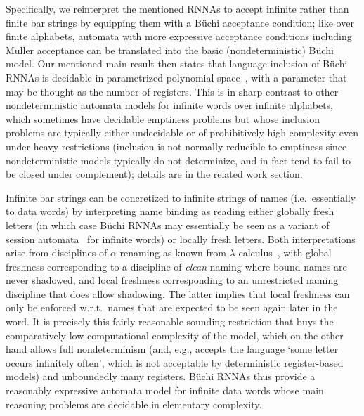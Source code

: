 \documentclass[final,a4paper,UKenglish,thm-restate,autoref,numberwithinsect]{lipics-v2021}
\numberwithin{equation}{section}
\newcommand{\+}[1]{\mathcal{#1}\xspace}
\theoremstyle{definition}
\begin{document}
\enlargethispage{5pt} Specifically, we reinterpret the mentioned RNNAs
to accept infinite rather than finite bar strings by equipping them
with a B\"uchi acceptance condition; like over finite alphabets,
automata with more expressive acceptance conditions including Muller
acceptance can be translated into the basic (nondeterministic) B\"uchi
model. Our mentioned main result then states that language inclusion
of B\"uchi RNNAs is decidable in parametrized polynomial
space~\cite{StockhusenTantau13}, with a parameter that may be thought
as the number of registers. This is in sharp contrast to other
nondeterministic automata models for infinite words over infinite
alphabets, which sometimes have decidable emptiness problems but whose
inclusion problems are typically either undecidable or of
prohibitively high complexity even under heavy restrictions (inclusion
is not normally reducible to emptiness since nondeterministic models
typically do not determinize, and in fact tend to fail to be closed
under complement); details are in the related work section.

Infinite bar strings can be concretized to infinite strings of names
(i.e.~essentially to data words) by interpreting name binding as
reading either globally fresh letters (in which case B\"uchi RNNAs may
essentially be seen as a variant of session automata~\cite{BolligEA14}
for infinite words) or locally fresh letters. Both interpretations
arise from disciplines of $\alpha$-renaming as known from
$\lambda$-calculus~\cite{barendregt85}, with global freshness corresponding to a
discipline of \emph{clean} naming where bound names are never
shadowed, and local freshness corresponding to an unrestricted naming
discipline that does allow shadowing. The latter implies that local
freshness can only be enforced w.r.t.~names that are expected to be
seen again later in the word. It is precisely this fairly
reasonable-sounding restriction that buys the comparatively low
computational complexity of the model, which on the other hand allows
full nondeterminism (and, e.g., accepts the language `some letter
occurs infinitely often', which is not acceptable by deterministic
register-based models) and unboundedly many registers. B\"uchi RNNAs
thus provide a reasonably expressive automata model for infinite data
words whose main reasoning problems are decidable in elementary
complexity.
\end{document}

